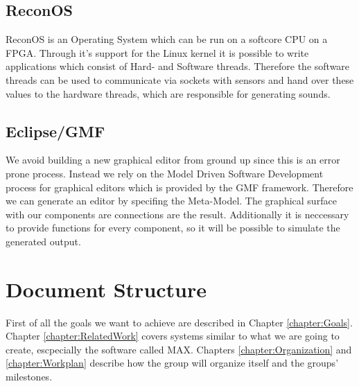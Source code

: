 	  \subsection{ReconOS}
		ReconOS is an Operating System which can be run on a softcore CPU on a FPGA. Through it's support for the Linux kernel it is possible to write applications which consist of Hard- and Software threads. Therefore the software threads can be used to communicate via sockets with sensors and hand over these values to the hardware threads, which are responsible for generating sounds.
	  \subsection{Eclipse/GMF}
		We avoid building a new graphical editor from ground up since this is an error prone process. Instead we rely on the Model Driven Software Development process for graphical editors which is provided by the GMF framework. Therefore we can generate an editor by specifing the Meta-Model. The graphical surface with our components are connections are the result. Additionally it is neccessary to provide functions for every component, so it will be possible to simulate the generated output.
	  
		\section{Document Structure}
		First of all the goals we want to achieve are described in Chapter \ref{chapter:Goals}. Chapter \ref{chapter:RelatedWork} covers systems similar to what we are going to create, escpecially the software 
		called MAX.	Chapters \ref{chapter:Organization} and \ref{chapter:Workplan} describe how the group will organize itself and the groups' milestones.
      